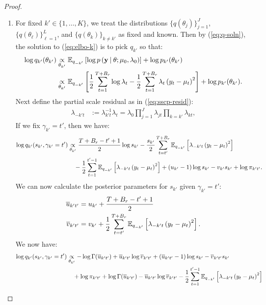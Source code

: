 \begin{proof}
\begin{enumerate}[label=\roman*.]
\item For fixed $k' \in\{1,\ldots,K\}$, we treat the distributions $\{q(\theta_{j})\}_{j=1}^J$, $\{q(\theta_\ell)\}_{\ell=1}^L$, and $\{q(\theta_k)\}_{k \neq k'}$ as fixed and known. Then by (\ref{eq:q-soln}), the solution to (\ref{eq:elbo-k}) is to pick $q_{k'}$ so that:
\begin{align*}
    \log q_{k'}(\theta_{k'}) &\underset{\theta_{k'}}{\propto} \mathbb{E}_{q_{-k'}} \left[\log p\left(\mathbf{y} \:|\: \theta;\mu_0,\lambda_0\right)\right] + \log p_{k'}(\theta_{k'}) \\
    &\underset{\theta_{k'}}{\propto}  \mathbb{E}_{q_{-k'}}\left[\frac{1}{2}\sum_{t=1}^{T+B_r} \log\lambda_t - \frac{1}{2}\sum_{t=1}^{T+B_r} \lambda_{t}\left(y_t - \mu_t\right)^2\right] + \log p_{k'}(\theta_{k'}).
\end{align*}
Next define the partial scale residual as in (\ref{eq:sscp-resid}):
\begin{align*}
    \lambda_{-k't} &:= \lambda_{k't}^{-1}\lambda_t = \lambda_0\prod_{j =1 }^J\lambda_{jt} \prod_{k=k'} \lambda_{kt}, 
\end{align*}
If we fix $\gamma_{k'} = t'$, then we have:
\begin{align*}
    \log q_{k'}(s_{k'},\gamma_{k'} = t') &\underset{\theta_{k'}}{\propto} \frac{T+B_r - t' + 1}{2} \log s_{k'} - \frac{s_{k'}}{2}\sum_{t=t'}^{T+B_r} \mathbb{E}_{q_{-k'}}\left[\lambda_{-k't}\left(y_t - \mu_t\right)^2\right] \\
    &\quad - \frac{1}{2}\sum_{t=1}^{t'-1} \mathbb{E}_{q_{-k'}}\left[\lambda_{-k't}\left(y_t - \mu_t\right)^2\right]  + (u_{k'}-1)\log s_{k'} - v_{k'} s_{k'} + \log \pi_{k't'}.
\end{align*}
We can now calculate the posterior parameters for $s_{k'}$ given $\gamma_{k'} = t'$:
\begin{align*}
    \overline{u}_{k't'} &= u_{k'} + \frac{T+B_r-t'+1}{2} \\
    \overline{v}_{k't'} &= v_{k'} + \frac{1}{2}\sum_{t=t'}^{T+B_r} \mathbb{E}_{q_{-k'}}\left[\lambda_{-k't}\left(y_t - \mu_t\right)^2\right].
\end{align*}
We now have:
\begin{align*}
    \log q_{k'}(s_{k'},\gamma_{k'} = t') 
    &\underset{\theta_{k'}}{\propto} -  \log\Gamma(\overline{u}_{k't'}) + \overline{u}_{k't'} \log \overline{v}_{k't'} + \left(\overline{u}_{k't'} -1\right)\log s_{k'}  - \overline{v}_{k't'} s_{k'} \\
    &\quad + \log \pi_{k't'} + \log\Gamma(\overline{u}_{k't'}) - \overline{u}_{k't'} \log \overline{v}_{k't'} - \frac{1}{2}\sum_{t=1}^{t'-1} \E_{q_{-k'}}\left[\lambda_{-k't}\left(y_t - \mu_t\right)^2\right]

\end{align*}
\end{enumerate}
\end{proof}
